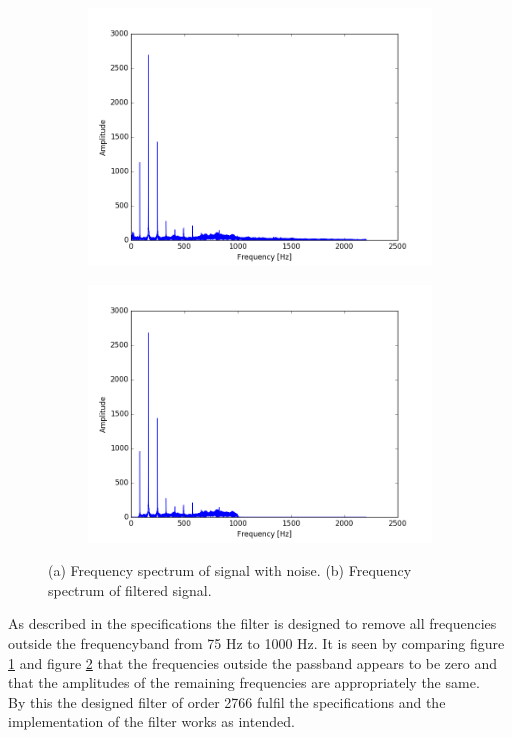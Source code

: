 \begin{figure}[H]
\centering
\begin{subfigure}{0.49\textwidth}
\centering
\includegraphics[width=\textwidth]{figures/filtertest/SIGNAL.png}
\caption{}
\label{fig:SIGNAL}
\end{subfigure}
\begin{subfigure}{0.49\textwidth}
\centering
\includegraphics[width=\textwidth]{figures/filtertest/filt_SIGNAL.png}
\caption{}
\label{fig:filt_SIGNAL}
\end{subfigure}
\caption{(a) Frequency spectrum of signal with noise. (b) Frequency spectrum of filtered signal.}
\label{fig:test_res}
\end{figure}
As described in the specifications the filter is designed to remove all frequencies outside the frequencyband from 75 Hz to 1000 Hz. It is seen by comparing figure \ref{fig:SIGNAL} and figure \ref{fig:filt_SIGNAL} that the frequencies outside the passband appears to be zero and that the amplitudes of the remaining frequencies are appropriately the same. \\
By this the designed filter of order 2766 fulfil the specifications and the implementation of the filter works as intended. \\